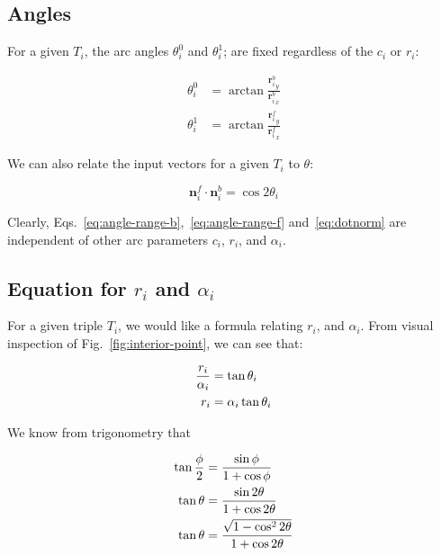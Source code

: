 \documentclass{article}
\begin{document}
\subsection{Angles}

For a given $T_i$, the arc angles $\theta^0_i$ and $\theta^{1}_{i}$; are fixed regardless of the $c_i$ or $r_{i}$:

\begin{align}
  \label{eq:angle-range-b}
  \theta^{0}_{i} &= \arctan \frac{{\mathbf{r}^{b}_{i}}_{y}}{{\mathbf{r}^{b}_{i}}_{x}}\\
  \label{eq:angle-range-f}
  \theta^{1}_{i} &= \arctan \frac{{\mathbf{r}^{f}_{i}}_{y}}{{\mathbf{r}^{f}_{i}}_{x}}
\end{align}

We can also relate the input vectors for a given $T_{i}$ to $\theta$:

\begin{equation}
  \label{eq:dotnorm}
  \mathbf{n}^{f}_{i} \cdot \mathbf{n}^{b}_{i} = \cos 2\theta_i
\end{equation}

Clearly, Eqs.~\eqref{eq:angle-range-b},~\eqref{eq:angle-range-f} and~\eqref{eq:dotnorm} are independent of other arc parameters $c_{i}$, $r_{i}$, and $\alpha_i$.

\subsection{Equation for $r_i$ and $\alpha_{i}$}

For a given triple $T_{i}$, we would like a formula relating $r_{i}$, and $\alpha_{i}$.  From visual inspection of Fig.~\ref{fig:interior-point}, we can see that:

\begin{align}
  \notag
  \frac{r_i}{\alpha_{i}} &= \tan \theta_i\\
  \label{eq:tantheta}
  r_i &= \alpha_{i}\tan \theta_i
\end{align}

We know from trigonometry that

\begin{align}
  \notag
  \tan \frac{\phi}{2} &= \frac{\sin\phi}{1+\cos\phi}\\
  \notag
  \tan \theta &= \frac{\sin 2\theta}{1+\cos 2\theta}\\
  \label{eq:tanident}
  \tan \theta &= \frac{\sqrt{1-\cos^{2} 2\theta}}{1+\cos 2\theta}
\end{align}
\end{document}
